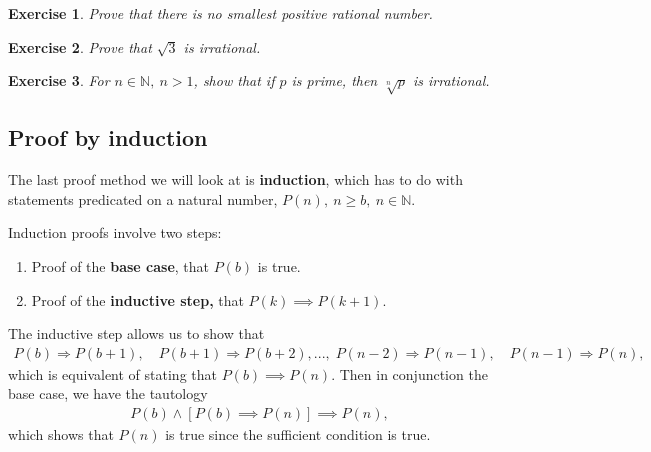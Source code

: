 \documentclass{article}[12pt]
\newtheorem{exercise}{Exercise}[section]
\newcommand{\N}{\mathbb{N}}
\begin{document}
        \begin{exercise}
            Prove that there is no smallest positive rational number.
        \end{exercise}
        
        \begin{exercise}
            Prove that $\sqrt{3}$ is irrational.
        \end{exercise}
        
        
        \begin{exercise}
            For $n \in \N,\ n > 1$, show that if $p$ is prime, then $\sqrt[n]{p}$ is irrational.
        \end{exercise}
        
    \subsection{Proof by induction}
    
        The last proof method we will look at is \textbf{induction}, which has to do with statements predicated on a natural number, $P(n),\ n \ge b,\ n \in \N$.
        
        Induction proofs involve two steps:
        \begin{enumerate}
            \item 
            Proof of the \textbf{base case}, that $P(b)$ is true.
            
            \item
            Proof of the \textbf{inductive step,} that $P(k) \implies P(k+1)$. 
        \end{enumerate}
        
        The inductive step allows us to show that
        \begin{align}
            P(b) \Rightarrow P(b+1),\quad
            P(b+1) \Rightarrow P(b+2),
            ... ,\;
            P(n-2) \Rightarrow P(n-1),\quad
            P(n-1) \Rightarrow P(n),
        \end{align}
        which is equivalent of stating that $P(b) \implies P(n)$. Then in conjunction the base case, we have the tautology
        \begin{align}
            P(b) \land [P(b) \implies P(n)]
            \implies
            P(n),
        \end{align}
        which shows that $P(n)$ is true since the sufficient condition is true.
        
\end{document}
